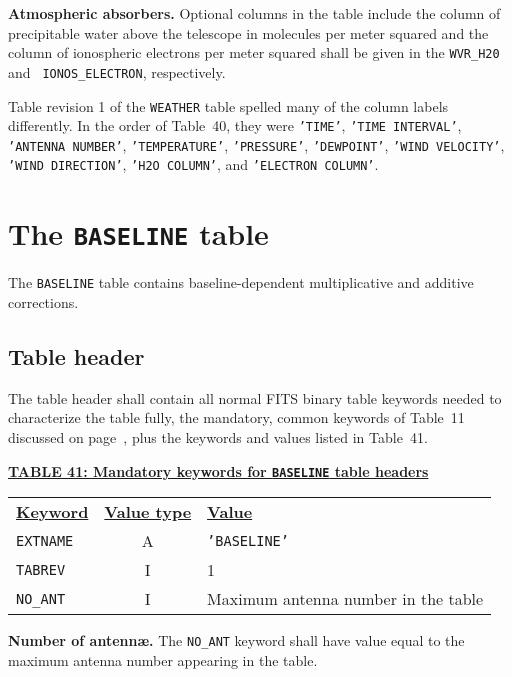 \documentclass[twoside]{article}
\newcommand{\Me}[1]{\textcolor{mecol}{#1}}
\begin{document}
{\bf Atmospheric absorbers.}  \Me{Optional columns in the table
  include} the column of precipitable water above the telescope in
molecules per meter squared and the column of ionospheric electrons
per meter squared shall be given in the {\tt WVR\_H20} and {\tt
  IONOS\_ELECTRON}, respectively.

Table revision 1 of the {\tt WEATHER} table spelled many of the column
labels differently.  In the order of Table~40, they were {\tt 'TIME'},
{\tt 'TIME INTERVAL'}, {\tt 'ANTENNA NUMBER'}, {\tt 'TEMPERATURE'},
{\tt 'PRESSURE'}, {\tt 'DEWPOINT'}, {\tt 'WIND VELOCITY'}, {\tt 'WIND
  DIRECTION'}, {\tt 'H2O COLUMN'}, and {\tt 'ELECTRON COLUMN'}\@.

\section{The {\tt BASELINE} table}
\label{s:BL}

The {\tt BASELINE} table contains baseline-dependent multiplicative
and additive corrections.

\subsection{Table header}

The table header shall contain all normal FITS binary table keywords
needed to characterize the table fully, the mandatory, common keywords
of Table~11 discussed on page~\pageref{ta:keywords}, plus the keywords
and values listed in Table~41.

\begin{center}
\underline{\bf{TABLE 41: Mandatory keywords for {\tt BASELINE} table
    headers}}\\
\begin{tabular}{lcl}
\noalign{\vspace{2pt}}
\underline{{\bf Keyword}} & \underline{\bf{Value type}} &
    \underline{\bf{Value\vphantom{y}}} \\
\noalign{\vspace{2pt}}
{\tt EXTNAME}   & A & {\tt 'BASELINE'}  \\
{\tt TABREV}    & I & 1 \\
{\tt NO\_ANT}   & I & Maximum antenna number in the table \\
\end{tabular}
\end{center}

{\bf Number of antenn\ae.}  The {\tt NO\_ANT} keyword shall have value
equal to the maximum antenna number appearing in the table.
\end{document}
